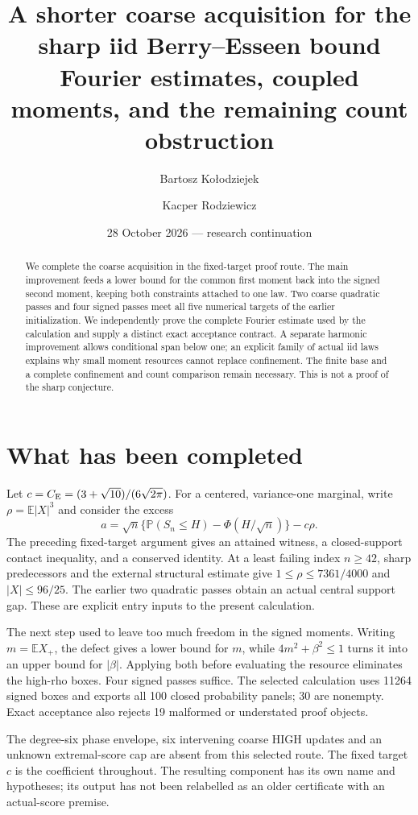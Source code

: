\documentclass[11pt,a4paper]{article}
\title{A shorter coarse acquisition for the sharp iid Berry--Esseen bound\\
\large Fourier estimates, coupled moments, and the remaining count obstruction}
\author{Bartosz Ko\l odziejek \and Kacper Rodziewicz}
\date{28 October 2026 --- research continuation}
\newcommand{\E}{\mathbb E}
\newcommand{\Pp}{\mathbb P}
\begin{document}
\maketitle
\begin{abstract}
We complete the coarse acquisition in the fixed-target proof route.
The main improvement feeds a lower bound for the common first moment
back into the signed second moment, keeping both constraints attached
to one law. Two coarse quadratic passes and four signed passes meet
all five numerical targets of the earlier initialization.
We independently prove the complete Fourier estimate used by the
calculation and supply a distinct exact acceptance contract.
A separate harmonic improvement allows conditional span below one;
an explicit family of actual iid laws explains why small moment
resources cannot replace confinement. The finite base and a complete
confinement and count comparison remain necessary. This is not a
proof of the sharp conjecture.
\end{abstract}

\section{What has been completed}
Let $c=C_{\rm E}=(3+\sqrt{10})/(6\sqrt{2\pi})$. For a centered,
variance-one marginal, write $\rho=\E|X|^3$ and consider the excess
\[
 a=\sqrt n\{\Pp(S_n\le H)-\Phi(H/\sqrt n)\}-c\rho .
\]
The preceding fixed-target argument gives an attained witness, a
closed-support contact inequality, and a conserved identity.
At a least failing index $n\ge42$, sharp predecessors and the external
structural estimate give $1\le\rho\le7361/4000$ and $|X|\le96/25$.
The earlier two quadratic passes obtain an actual central support gap.
These are explicit entry inputs to the present calculation.

The next step used to leave too much freedom in the signed moments.
Writing $m=\E X_+$, the defect gives a lower bound for $m$, while
$4m^2+\beta^2\le1$ turns it into an upper bound for $|\beta|$.
Applying both before evaluating the resource eliminates the high-rho
boxes. Four signed passes suffice. The selected calculation uses 11264
signed boxes and exports all 100 closed probability panels; 30 are
nonempty. Exact acceptance also rejects 19 malformed or understated
proof objects.

The degree-six phase envelope, six intervening coarse HIGH updates and
an unknown extremal-score cap are absent from this selected route.
The fixed target $c$ is the coefficient throughout. The resulting
component has its own name and hypotheses; its output has not been
relabelled as an older certificate with an actual-score premise.
\end{document}
